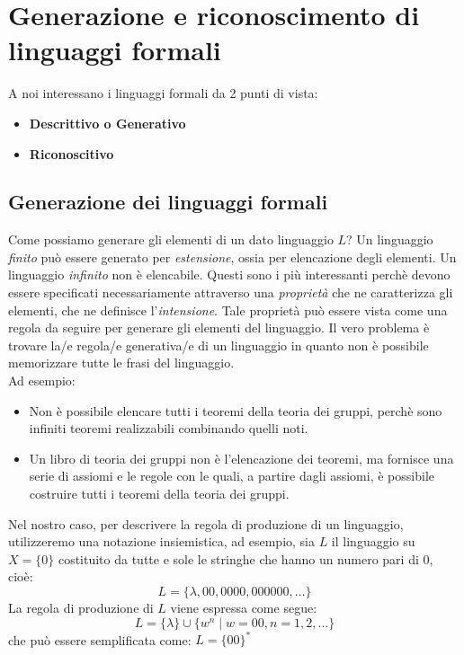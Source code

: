 \documentclass[12pt]{report}
\begin{document}
	\section{Generazione e riconoscimento di linguaggi formali}
	A noi interessano i linguaggi formali da 2 punti di vista:
	\begin{itemize}
		\item \textbf{Descrittivo o Generativo}
		\item \textbf{Riconoscitivo}
	\end{itemize}
	\subsection{Generazione dei linguaggi formali}
	Come possiamo generare gli elementi di un dato linguaggio $L$? Un linguaggio \textit{finito} può essere generato per \textit{estensione}, ossia per elencazione degli elementi. Un linguaggio \textit{infinito} non è elencabile. Questi sono i più interessanti perchè devono essere specificati necessariamente attraverso una \textit{proprietà} che ne caratterizza gli elementi, che ne definisce l'\textit{intensione}. Tale proprietà può essere vista come una regola da seguire per generare gli elementi del linguaggio. Il vero problema è trovare la/e regola/e generativa/e di un linguaggio in quanto non  è possibile memorizzare tutte le frasi del linguaggio. \\
	Ad esempio:
	\begin{itemize}
		\item Non è possibile elencare tutti i teoremi della teoria dei gruppi, perchè sono infiniti teoremi realizzabili combinando quelli noti.
		\item Un libro di teoria dei gruppi non è l'elencazione dei teoremi, ma fornisce una serie di assiomi e le regole con le quali, a partire dagli assiomi, è possibile costruire tutti i teoremi della teoria dei gruppi.
	\end{itemize}
	Nel nostro caso, per descrivere la regola di produzione di un linguaggio, utilizzeremo una notazione insiemistica, ad esempio, sia $L$ il linguaggio su
	$X = \{0\}$ costituito da tutte e sole le stringhe che hanno un numero pari di 0, cioè:
	\[
	L = \{\lambda, 00, 0000, 000000, \dots\}
	\]
	La regola di produzione di $L$ viene espressa come segue:
	\[
	L = \{\lambda\} \cup \{w^n \mid w = 00, n = 1,2, \dots\}
	\]
	che può essere semplificata come: $L = \{00\}^*$
\end{document}
